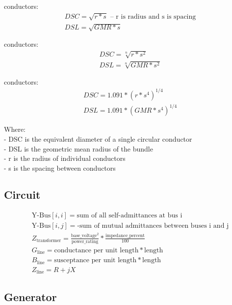 \documentclass{article}
\begin{document}
	 conductors: \\
	\begin{align*}
		& DSC = \sqrt{r * s} \text{ -- r is radius and s is spacing} \\
		& DSL = \sqrt{GMR * s}
	\end{align*}

	 conductors: \\
	\begin{align*}
		& DSC = \sqrt[n]{r * s^2} \\
		& DSL = \sqrt[n]{GMR * s^2}
	\end{align*}

	 conductors: \\
	\begin{align*}
		& DSC = 1.091 * (r * s^4)^{1/4} \\
		& DSL = 1.091 * (GMR * s^4)^{1/4}
	\end{align*}
	
	\noindent
	Where: \\
	- DSC is the equivalent diameter of a single circular conductor \\
	- DSL is the geometric mean radius of the bundle \\
	- r is the radius of individual conductors \\
	- s is the spacing between conductors 
	
	\subsection*{Circuit}
	
	\begin{align*}
		& \text{Y-Bus}[i,i] = \text{sum of all self-admittances at bus i} \\
		& \text{Y-Bus}[i,j] = \text{-sum of mutual admittances between buses i and j} \\
		& Z_{\text{transformer}} = \frac{\text{base\_voltage}^2}{\text{power\_rating}} * \frac{\text{impedance\_percent}}{100} \\
		& G_{\text{line}} = \text{conductance per unit length} * \text{length} \\
		& B_{\text{line}} = \text{susceptance per unit length} * \text{length} \\
		& Z_{\text{line}} = R + jX
	\end{align*}
	
	\subsection*{Generator}
	
\end{document}
